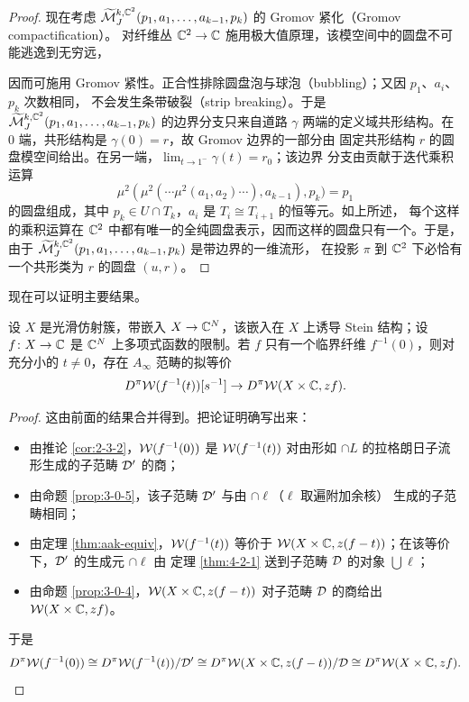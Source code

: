 \begin{proof}

现在考虑 $\widetilde{\mathcal{M}}_J^{k,\mathbb{C}^2}(p_1,a_1,\dots,a_{k-1},p_k)$ 的 Gromov 紧化（Gromov compactification）。
对纤维丛 $\mathbb{C}^2\to\mathbb{C}$ 施用极大值原理，该模空间中的圆盘不可能逃逸到无穷远，

因而可施用 Gromov 紧性。正合性排除圆盘泡与球泡（bubbling）；又因 $p_1$、$a_i$、$p_k$ 次数相同，
不会发生条带破裂（strip breaking）。于是
$\widetilde{\mathcal{M}}_J^{k,\mathbb{C}^2}(p_1,a_1,\dots,a_{k-1},p_k)$ 的边界分支只来自道路 $\gamma$
两端的定义域共形结构。在 $0$ 端，共形结构是 $\gamma(0)=r$，故 Gromov 边界的一部分由
固定共形结构 $r$ 的圆盘模空间给出。在另一端，$\lim_{t\to1^-}\gamma(t)=r_0$；该边界
分支由贡献于迭代乘积运算
\[
\mu^2(\mu^2(\cdots\mu^2(a_1,a_2)\cdots),a_{k-1}),p_k)=p_1
\]
的圆盘组成，其中 $p_k\in U\cap T_k$，$a_i$ 是 $T_i\cong T_{i+1}$ 的恒等元。如上所述，
每个这样的乘积运算在 $\mathbb{C}^2$ 中都有唯一的全纯圆盘表示，因而这样的圆盘只有一个。于是，
由于 $\widetilde{\mathcal{M}}_J^{k,\mathbb{C}^2}(p_1,a_1,\dots,a_{k-1},p_k)$ 是带边界的一维流形，
在投影 $\pi$ 到 $\mathbb{C}^2$ 下必恰有一个共形类为 $r$ 的圆盘 $(u,r)$。
\end{proof}

现在可以证明主要结果。

\begin{thmstar}
设 $X$ 是光滑仿射簇，带嵌入 $X\to\mathbb{C}^N$，该嵌入在 $X$ 上诱导 Stein 结构；设
$f\colon X\to\mathbb{C}$ 是 $\mathbb{C}^N$ 上多项式函数的限制。若 $f$ 只有一个临界纤维
$f^{-1}(0)$，则对充分小的 $t\neq0$，存在 $A_\infty$ 范畴的拟等价
\[
D^\pi\mathcal{W}(f^{-1}(t))[s^{-1}]\to D^\pi\mathcal{W}(X\times\mathbb{C},zf).
\]
\end{thmstar}


\begin{proof}
这由前面的结果合并得到。把论证明确写出来：
\begin{itemize}
\item 由推论 \ref{cor:2-3-2}，$\mathcal{W}(f^{-1}(0))$ 是 $\mathcal{W}(f^{-1}(t))$ 对由形如
$\cap L$ 的拉格朗日子流形生成的子范畴 $\mathcal{D}'$ 的商；
\item 由命题 \ref{prop:3-0-5}，该子范畴 $\mathcal{D}'$ 与由 $\cap\ell$（$\ell$ 取遍附加余核）
生成的子范畴相同；
\item 由定理 \ref{thm:aak-equiv}，$\mathcal{W}(f^{-1}(t))$ 等价于
$\mathcal{W}(X\times\mathbb{C},z(f-t))$；在该等价下，$\mathcal{D}'$ 的生成元 $\cap\ell$ 由
定理 \ref{thm:4-2-1} 送到子范畴 $\mathcal{D}$ 的对象 $\bigcup\ell$；
\item 由命题 \ref{prop:3-0-4}，$\mathcal{W}(X\times\mathbb{C},z(f-t))$ 对子范畴 $\mathcal{D}$ 的商给出
$\mathcal{W}(X\times\mathbb{C},zf)$。
\end{itemize}
于是
\[
D^\pi\mathcal{W}(f^{-1}(0))\cong D^\pi\mathcal{W}(f^{-1}(t))/\mathcal{D}'
\cong D^\pi\mathcal{W}(X\times\mathbb{C},z(f-t))/\mathcal{D}\cong D^\pi\mathcal{W}(X\times\mathbb{C},zf).
\]
\end{proof}

